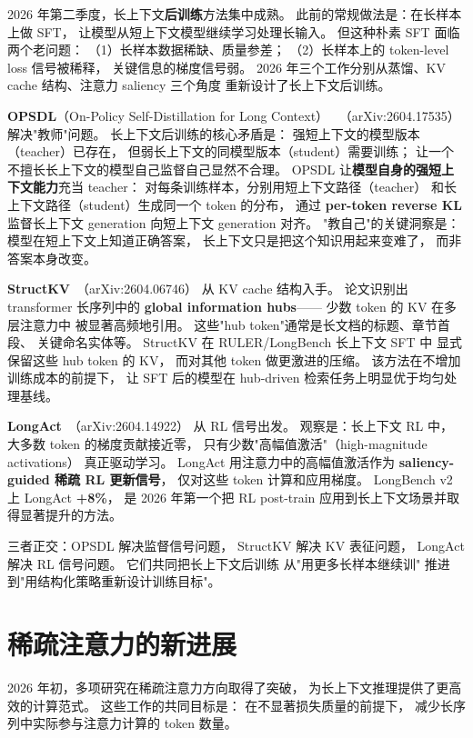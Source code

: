 2026 年第二季度，长上下文\textbf{后训练}方法集中成熟。
此前的常规做法是：在长样本上做 SFT，
让模型从短上下文模型继续学习处理长输入。
但这种朴素 SFT 面临两个老问题：
（1）长样本数据稀缺、质量参差；
（2）长样本上的 token-level loss 信号被稀释，
关键信息的梯度信号弱。
2026 年三个工作分别从蒸馏、KV cache 结构、注意力 saliency 三个角度
重新设计了长上下文后训练。

\textbf{OPSDL}（On-Policy Self-Distillation for Long Context）
~\cite{opsdl2026}（arXiv:2604.17535）
解决"教师"问题。
长上下文后训练的核心矛盾是：
强短上下文的模型版本（teacher）已存在，
但弱长上下文的同模型版本（student）需要训练；
让一个不擅长长上下文的模型自己监督自己显然不合理。
OPSDL 让\textbf{模型自身的强短上下文能力}充当 teacher：
对每条训练样本，分别用短上下文路径（teacher）
和长上下文路径（student）生成同一个 token 的分布，
通过 \textbf{per-token reverse KL} 监督长上下文 generation
向短上下文 generation 对齐。
"教自己"的关键洞察是：
模型在短上下文上知道正确答案，
长上下文只是把这个知识用起来变难了，
而非答案本身改变。

\textbf{StructKV}~\cite{structkv2026}（arXiv:2604.06746）
从 KV cache 结构入手。
论文识别出 transformer 长序列中的
\textbf{global information hubs}——
少数 token 的 KV 在多层注意力中
被显著高频地引用。
这些"hub token"通常是长文档的标题、章节首段、
关键命名实体等。
StructKV 在 RULER/LongBench 长上下文 SFT 中
显式保留这些 hub token 的 KV，
而对其他 token 做更激进的压缩。
该方法在不增加训练成本的前提下，
让 SFT 后的模型在 hub-driven 检索任务上明显优于均匀处理基线。

\textbf{LongAct}~\cite{longact2026}（arXiv:2604.14922）
从 RL 信号出发。
观察是：长上下文 RL 中，
大多数 token 的梯度贡献接近零，
只有少数"高幅值激活"（high-magnitude activations）
真正驱动学习。
LongAct 用注意力中的高幅值激活作为
\textbf{saliency-guided 稀疏 RL 更新信号}，
仅对这些 token 计算和应用梯度。
LongBench v2 上 LongAct \textbf{+8\%}，
是 2026 年第一个把 RL post-train
应用到长上下文场景并取得显著提升的方法。

三者正交：OPSDL 解决监督信号问题，
StructKV 解决 KV 表征问题，
LongAct 解决 RL 信号问题。
它们共同把长上下文后训练
从"用更多长样本继续训"
推进到"用结构化策略重新设计训练目标"。

\section{稀疏注意力的新进展}
\label{sec:sparse-attention-2026}

2026 年初，多项研究在稀疏注意力方向取得了突破，
为长上下文推理提供了更高效的计算范式。
这些工作的共同目标是：
在不显著损失质量的前提下，
减少长序列中实际参与注意力计算的 token 数量。

